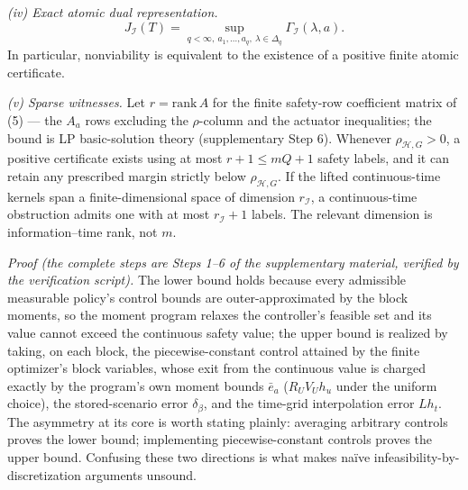 \documentclass[10pt,twocolumn]{article}
\theoremstyle{plain}
\theoremstyle{definition}
\theoremstyle{remark}
\begin{document}
\noindent\emph{(iv) Exact atomic dual representation.}
\[
J_{\mathcal{I}}(T) = \sup_{q < \infty,\ a_1,\dots,a_q,\
\lambda \in \Delta_q} \Gamma_{\mathcal{I}}(\lambda, a).
\tag{9}
\]
In particular, nonviability is equivalent to the existence of a positive
finite atomic certificate.

\noindent\emph{(v) Sparse witnesses.} Let \(r = \mathrm{rank}\, A\) for the
finite safety-row coefficient matrix of (5) --- the \(A_a\) rows excluding
the \(\rho\)-column and the actuator inequalities; the bound is LP
basic-solution theory (supplementary Step 6). Whenever \(\rho_{\mathcal{H},G} > 0\), a
positive certificate exists using at most \(r + 1 \le mQ + 1\) safety labels,
and it can retain any prescribed margin strictly below
\(\rho_{\mathcal{H},G}\). If the lifted continuous-time kernels span a
finite-dimensional space of dimension \(r_{\mathcal{I}}\), a continuous-time
obstruction admits one with at most \(r_{\mathcal{I}} + 1\) labels. The relevant
dimension is information--time rank, not \(m\).

\emph{Proof (the complete steps are Steps 1--6 of the supplementary
material, verified by the verification script).} The lower bound holds because every admissible
measurable policy's control bounds are outer-approximated by the block
moments, so the moment program relaxes the controller's feasible set and
its value cannot exceed the continuous safety value; the upper bound is
realized by taking, on each block, the piecewise-constant control attained
by the finite optimizer's block variables, whose exit from the continuous
value is charged exactly by the program's own moment bounds \(\bar{e}_a\)
(\(R_U V_U h_u\) under the uniform choice), the stored-scenario error
\(\delta_\beta\), and the time-grid interpolation error \(L h_t\). The asymmetry at its core is
worth stating plainly: averaging arbitrary controls proves the lower bound;
implementing piecewise-constant controls proves the upper bound. Confusing
these two directions is what makes na\"ive infeasibility-by-discretization
arguments unsound.
\end{document}
